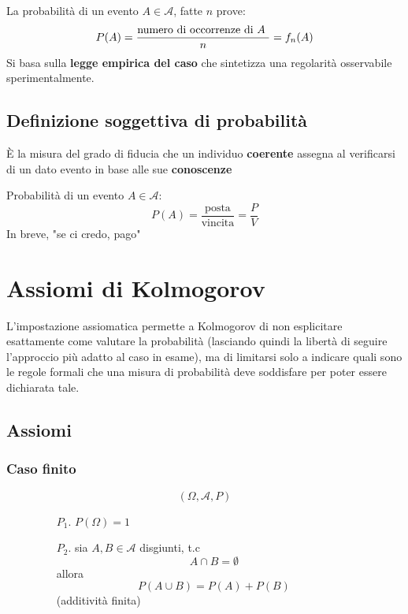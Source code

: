 \documentclass[a4paper]{article}
\theoremstyle{break}
\theoremstyle{break}
\theoremstyle{break}
\theoremstyle{break}
\begin{document}
La probabilità di un evento \( A \in \mathcal{A} \), fatte \( n \) prove:
\[
	P(A) = \frac{\text{numero di occorrenze di \( A \) }}{n} = f_n(A)
\]
Si basa sulla \textbf{legge empirica del caso} che sintetizza una regolarità osservabile
sperimentalmente.

\subsection{Definizione soggettiva di probabilità}
È la misura del grado di fiducia che un individuo \textbf{coerente} assegna al verificarsi
di un dato evento in base alle sue \textbf{conoscenze}

Probabilità di un evento \( A \in \mathcal{A} \):
\[
	P(A) = \frac{\text{posta}}{\text{{vincita}}} = \frac{P}{V}
\]
In breve, "se ci credo, pago"

\section{Assiomi di Kolmogorov}
L’impostazione assiomatica permette a Kolmogorov di non esplicitare esattamente come
valutare la probabilità (lasciando quindi la libertà di seguire l’approccio più adatto al caso in
esame), ma di limitarsi solo a indicare quali sono le regole formali che una misura di
probabilità deve soddisfare per poter essere dichiarata tale.

\subsection{Assiomi}
\subsubsection{Caso finito}
\begin{figure}[H]
	\begin{definition}
		\[
			(\Omega, \mathcal{A}, P)
		\]
		\begin{enumerate}
			\item[$P_1.$] \( P(\Omega) = 1 \)
			\item[$P_2.$] sia \( A,B \in \mathcal{A} \) disgiunti, t.c
			      \[
				      A \cap B = \emptyset
			      \]
			      allora
			      \[
				      P(A \cup B) = P(A) + P(B)
			      \]
			      (additività finita)
		\end{enumerate}
	\end{definition}
\end{figure}
\end{document}
